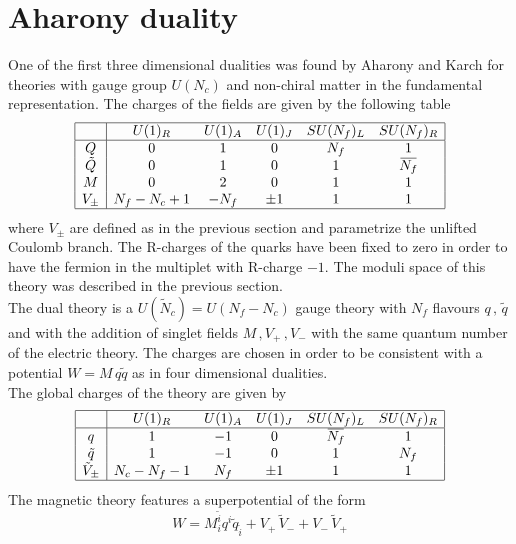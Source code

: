 \section{Aharony duality }
One of the first three dimensional dualities was found by Aharony \cite{Aharony:1997gp} and Karch \cite{Karch:1997ux} for theories with gauge group $U(N_c) $ and non-chiral matter in the fundamental representation.
The charges of the fields are given by the following table
\begin{equation}
\begin{array}{ | c | c c c c c |}
\hline
  & U(1)_R & U(1)_A & U(1)_J  & SU(N_f)_L & SU(N_f)_R \\
 \hline
 Q & 0 & 1& 0 & N_f& 1 \\ 
 \tilde{Q} & 0  & 1&0 & 1 & \overbar{N_f}  \\  
   M & 0 & 2 & 0 & 1 & 1 \\ 
  V_{\pm} & N_f - N_c + 1 & - N_f  & \pm 1 &  1 & 1 \\
  \hline
\end{array}
\end{equation}
where $V_{\pm} $ are defined as in the previous section and parametrize the unlifted Coulomb branch.
The R-charges of the quarks have been fixed to zero in order to have the fermion in the multiplet with R-charge $-1$.
The moduli space of this theory was described in the previous section.
\\
The dual theory is a $U(\tilde{N}_c) = U(N_f - N_c) $ gauge theory with $N_f$ flavours $q\, ,\, \tilde{q}$ and with the addition of singlet fields  $M \,,  V_+ \, , V_-$ with the same quantum number of the electric theory. 
The charges are chosen in order to be consistent with a potential $W = M \, q \tilde{q}$ as in four dimensional dualities.\\
The global charges of the theory are given by
\begin{equation}
\begin{array}{ | c | c c c c c | }
\hline
  & U(1)_R & U(1)_A & U(1)_J  & SU(N_f)_L & SU(N_f)_R \\
 \hline
 q & 1 & -1 & 0 & \overbar{N_f} & 1 \\  
 \tilde{q}& 1  & -1 & 0  & 1 & {N_f}  \\  
 \tilde{V}_{\pm} & N_c - N_f -1 & N_f  & \pm 1 &  1 & 1 \\
 \hline
\end{array}
\end{equation}
The magnetic theory features a superpotential of the form
\begin{equation}
W = M^{\tilde{i}}_i q^i \tilde{q}_{\tilde{i}} + V_+ \, \tilde{V}_- + V_- \, \tilde{V}_+
\label{eqn:aharony_mag_superpotential}
\end{equation}
